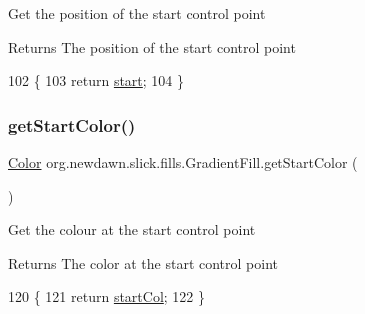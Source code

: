 Get the position of the start control point

\begin{DoxyReturn}{Returns}
The position of the start control point 
\end{DoxyReturn}

\begin{DoxyCode}
102                                \{
103         \textcolor{keywordflow}{return} \mbox{\hyperlink{classorg_1_1newdawn_1_1slick_1_1fills_1_1_gradient_fill_ae0e8a44c266db0e41cd213938c031ced}{start}};
104     \}
\end{DoxyCode}
\mbox{\label{classorg_1_1newdawn_1_1slick_1_1fills_1_1_gradient_fill_a9cdd6e5f146294e9bbdef697b80691fb}} 
\subsubsection{\texorpdfstring{get\+Start\+Color()}{getStartColor()}}
{\footnotesize\ttfamily \mbox{\hyperlink{classorg_1_1newdawn_1_1slick_1_1_color}{Color}} org.\+newdawn.\+slick.\+fills.\+Gradient\+Fill.\+get\+Start\+Color (\begin{DoxyParamCaption}{ }\end{DoxyParamCaption})\hspace{0.3cm}{\ttfamily [inline]}}

Get the colour at the start control point

\begin{DoxyReturn}{Returns}
The color at the start control point 
\end{DoxyReturn}

\begin{DoxyCode}
120                                  \{
121         \textcolor{keywordflow}{return} \mbox{\hyperlink{classorg_1_1newdawn_1_1slick_1_1fills_1_1_gradient_fill_a7d7a0f4539c16030b77f9b8dc06a5509}{startCol}};
122     \}
\end{DoxyCode}
\mbox{\label{classorg_1_1newdawn_1_1slick_1_1fills_1_1_gradient_fill_ab2f7ec3c613d0099d65927de537b407a}} 
